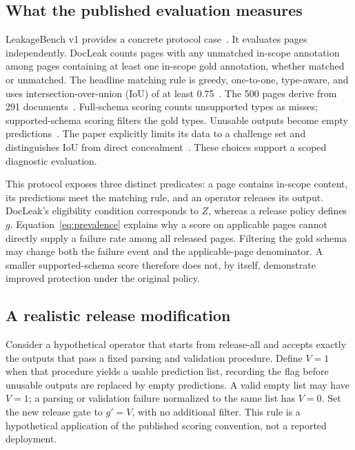 \documentclass[conference]{IEEEtran}
\begin{document}
\subsection{What the published evaluation measures}
LeakageBench v1 provides a concrete protocol case~\cite{leakagebench2026}. It evaluates pages independently. DocLeak counts pages with any unmatched in-scope annotation among pages containing at least one in-scope gold annotation, whether matched or unmatched. The headline matching rule is greedy, one-to-one, type-aware, and uses intersection-over-union (IoU) of at least 0.75~\cite[Secs.~3.1, 3.3--3.4]{leakagebench2026}. The 500 pages derive from 291 documents~\cite[Table~2]{leakagebench2026}. Full-schema scoring counts unsupported types as misses; supported-schema scoring filters the gold types. Unusable outputs become empty predictions~\cite[Secs.~5.1, 6]{leakagebench2026}. The paper explicitly limits its data to a challenge set and distinguishes IoU from direct concealment~\cite[Sec.~4.1, Limitations]{leakagebench2026}. These choices support a scoped diagnostic evaluation.

This protocol exposes three distinct predicates: a page contains in-scope content, its predictions meet the matching rule, and an operator releases its output. DocLeak's eligibility condition corresponds to $Z$, whereas a release policy defines $g$. Equation~\eqref{eq:prevalence} explains why a score on applicable pages cannot directly supply a failure rate among all released pages. Filtering the gold schema may change both the failure event and the applicable-page denominator. A smaller supported-schema score therefore does not, by itself, demonstrate improved protection under the original policy.

\subsection{A realistic release modification}
Consider a hypothetical operator that starts from release-all and accepts exactly the outputs that pass a fixed parsing and validation procedure. Define $V=1$ when that procedure yields a usable prediction list, recording the flag before unusable outputs are replaced by empty predictions. A valid empty list may have $V=1$; a parsing or validation failure normalized to the same list has $V=0$. Set the new release gate to $g'=V$, with no additional filter. This rule is a hypothetical application of the published scoring convention, not a reported deployment.
\end{document}
